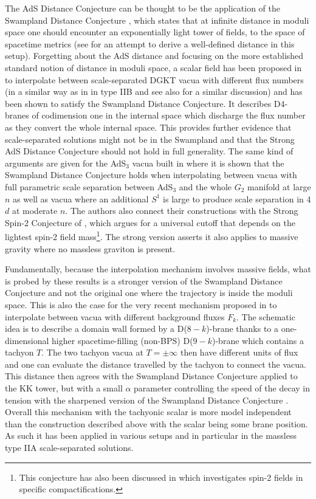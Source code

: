 \documentclass[11pt, a4paper]{article}
\begin{document}
The AdS Distance Conjecture can be thought to be the application of the Swampland Distance Conjecture \cite{Ooguri:2006in}, which states that at infinite distance in moduli space one should encounter an exponentially light tower of fields, to the space of spacetime metrics (see \cite{Li:2023gtt} for an attempt to derive a well-defined distance in this setup). Forgetting about the AdS distance and focusing on the more established standard notion of distance in moduli space, a scalar field has been proposed in \cite{Shiu:2022oti} to interpolate between scale-separated DGKT vacua with different flux numbers (in a similar way as in \cite{Kachru:2002gs,Scalisi:2020jal} in type IIB and see also \cite{Basile:2023rvm} for a similar discussion) and has been shown to satisfy the Swampland Distance Conjecture. It describes D4-branes of codimension one in the internal space which discharge the flux number as they convert the whole internal space. This provides further evidence that scale-separated solutions might not be in the Swampland and that the Strong AdS Distance Conjecture should not hold in full generality. The same kind of arguments are given for the AdS$_3$ vacua built in \cite{Farakos:2023wps} where it is shown that the Swampland Distance Conjecture holds when interpolating between vacua with full parametric scale separation between AdS$_3$ and the whole $G_2$ manifold at large $n$ as well as vacua where an additional $S^1$ is large to produce scale separation in 4$d$ at moderate $n$. The authors also connect their constructions with the Strong Spin-2 Conjecture of \cite{Klaewer:2018yxi}, which argues for a universal cutoff that depends on the lightest spin-2 field mass\footnote{This conjecture has also been discussed in \cite{DeLuca:2021ojx} which investigates spin-2 fields in specific compactifications.}. The strong version asserts it also applies to massive gravity where no massless graviton is present.

Fundamentally, because the interpolation mechanism involves massive fields, what is probed by these results is a stronger version of the Swampland Distance Conjecture and not the original one where the trajectory is inside the moduli space. This is also the case for the very recent mechanism proposed in \cite{Shiu:2023bay} to interpolate between vacua with different background fluxes $F_k$. The schematic idea is to describe a domain wall formed by a D($8-k$)-brane thanks to a one-dimensional higher spacetime-filling (non-BPS) D($9-k$)-brane which contains a tachyon $T$. The two tachyon vacua at $T=\pm\infty$ then have different units of flux and one can evaluate the distance travelled by the tachyon to connect the vacua. This distance then agrees with the Swampland Distance Conjecture applied to the KK tower, but with a small $\alpha$ parameter controlling the speed of the decay in tension with the sharpened version of the Swampland Distance Conjecture \cite{Etheredge:2022opl}. Overall this mechanism with the tachyonic scalar is more model independent than the construction described above with the scalar being some brane position. As such it has been applied in various setups and in particular in the massless type IIA scale-separated solutions.
\end{document}

